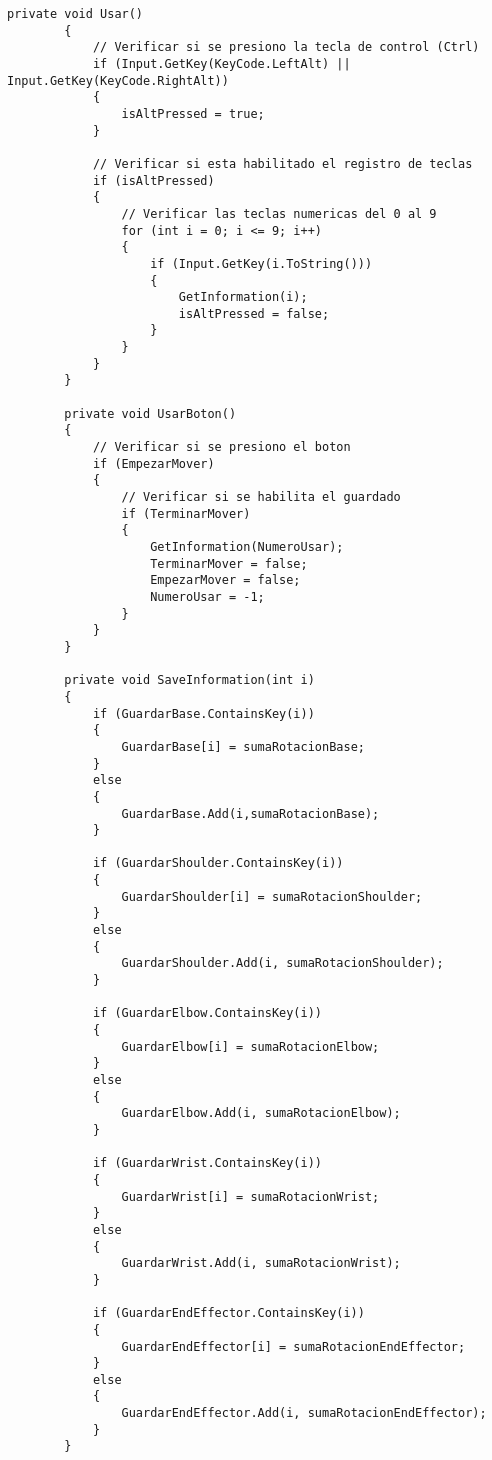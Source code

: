 \begin{lstlisting}[frame=single]
        private void Usar()
        {
            // Verificar si se presiono la tecla de control (Ctrl)
            if (Input.GetKey(KeyCode.LeftAlt) || Input.GetKey(KeyCode.RightAlt))
            {
                isAltPressed = true;
            }

            // Verificar si esta habilitado el registro de teclas
            if (isAltPressed)
            {
                // Verificar las teclas numericas del 0 al 9
                for (int i = 0; i <= 9; i++)
                {
                    if (Input.GetKey(i.ToString()))
                    {
                        GetInformation(i);
                        isAltPressed = false;
                    }
                }
            }
        }

        private void UsarBoton()
        {
            // Verificar si se presiono el boton
            if (EmpezarMover)
            {
                // Verificar si se habilita el guardado
                if (TerminarMover)
                {
                    GetInformation(NumeroUsar);
                    TerminarMover = false;
                    EmpezarMover = false;
                    NumeroUsar = -1;
                }
            }
        }

        private void SaveInformation(int i)
        {
            if (GuardarBase.ContainsKey(i))
            {
                GuardarBase[i] = sumaRotacionBase;
            }
            else
            {
                GuardarBase.Add(i,sumaRotacionBase);
            }

            if (GuardarShoulder.ContainsKey(i))
            {
                GuardarShoulder[i] = sumaRotacionShoulder;
            }
            else
            {
                GuardarShoulder.Add(i, sumaRotacionShoulder);
            }

            if (GuardarElbow.ContainsKey(i))
            {
                GuardarElbow[i] = sumaRotacionElbow;
            }
            else
            {
                GuardarElbow.Add(i, sumaRotacionElbow);
            }

            if (GuardarWrist.ContainsKey(i))
            {
                GuardarWrist[i] = sumaRotacionWrist;
            }
            else
            {
                GuardarWrist.Add(i, sumaRotacionWrist);
            }

            if (GuardarEndEffector.ContainsKey(i))
            {
                GuardarEndEffector[i] = sumaRotacionEndEffector;
            }
            else
            {
                GuardarEndEffector.Add(i, sumaRotacionEndEffector);
            }
        }


\end{lstlisting}
